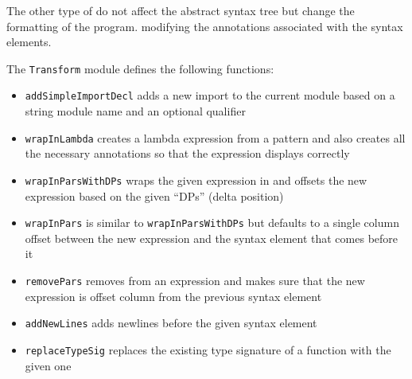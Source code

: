 \DIFdelend \DIFaddbegin {}\DIFaddend The other type of \DIFdelbegin {}\DIFdelend \DIFaddbegin {}\DIFaddend do not affect the abstract syntax tree but change the formatting of the program. \DIFdelbegin {}\DIFdelend \DIFaddbegin {}\DIFaddend modifying the annotations associated with the syntax elements. 

The \texttt{Transform} module defines the following functions:

\begin{itemize}
\item \texttt{addSimpleImportDecl} adds a new import to the current module based on a string module name and an optional qualifier\DIFaddbegin {}\DIFaddend \item \texttt{wrapInLambda} creates a lambda expression from a pattern and \DIFdelbegin {}\DIFdelend \DIFaddbegin {}\DIFaddend also creates all the necessary annotations so that the expression displays correctly\DIFaddbegin {}\DIFaddend \item \texttt{wrapInParsWithDPs} wraps the given expression in \DIFdelbegin {}\DIFdelend \DIFaddbegin {}\DIFaddend and offsets the new expression based on the given ``DPs'' (delta position)\DIFaddbegin {}\DIFaddend \item \texttt{wrapInPars} is similar to \texttt{wrapInParsWithDPs} but defaults to a single column offset between the new expression and the syntax element that comes before it\DIFaddbegin {}\DIFaddend \item  \texttt{removePars} removes \DIFdelbegin {}\DIFdelend \DIFaddbegin {}\DIFaddend from an expression and makes sure that the new expression is offset \DIFdelbegin {}\DIFdelend \DIFaddbegin {}\DIFaddend column from the previous syntax element\DIFaddbegin {}\DIFaddend \item \texttt{addNewLines} adds newlines before the given syntax element\DIFaddbegin {}\DIFaddend \item \texttt{replaceTypeSig} replaces the existing type signature of a function with the given one\DIFaddbegin {}
\end{itemize}
